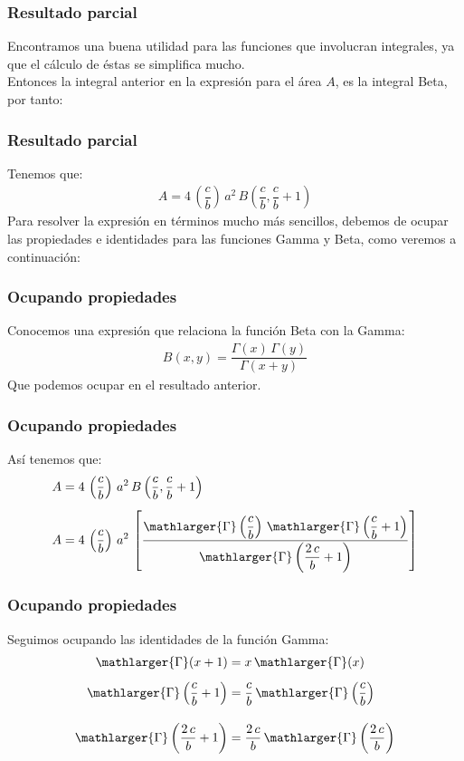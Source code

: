 \begin{frame}
\frametitle{Resultado parcial}
Encontramos una buena utilidad para las funciones que involucran integrales, ya que el cálculo de éstas se simplifica mucho.
\\
\bigskip
\pause
Entonces la integral anterior en la expresión para el área $A$, es la integral Beta, por tanto:
\end{frame}
\begin{frame}
\frametitle{Resultado parcial}
Tenemos que:
\begin{align*}
A = 4 \, \left( \dfrac{c}{b} \right) \, a^{2} \, B \left( \dfrac{c}{b}, \dfrac{c}{b} + 1 \right)
\end{align*}
\pause
Para resolver la expresión en términos mucho más sencillos, debemos de ocupar las propiedades e identidades para las funciones Gamma y Beta, como veremos a continuación:
\end{frame}
\begin{frame}
\frametitle{Ocupando propiedades}
Conocemos una expresión que relaciona la función Beta con la Gamma:
\begin{align*}
B (x, y) = \dfrac{\Gamma (x) \, \Gamma (y)}{\Gamma (x + y)}
\end{align*}
Que podemos ocupar en el resultado anterior.
\end{frame}
\begin{frame}
\frametitle{Ocupando propiedades}
Así tenemos que:
\begin{align*}
A &= 4 \, \left( \dfrac{c}{b} \right) \, a^{2} \, B \left( \dfrac{c}{b}, \dfrac{c}{b} + 1 \right) \\[0.5em]
A &= 4 \, \left( \dfrac{c}{b} \right) \, a^{2} \, \left[ \dfrac{\mathlarger{\Gamma} \left( \dfrac{c}{b} \right) \, \mathlarger{\Gamma} \left( \dfrac{c}{b} + 1 \right)}{\mathlarger{\Gamma} \left( \dfrac{2 \, c}{b} + 1 \right)} \right]
\end{align*}
\end{frame}
\begin{frame}
\frametitle{Ocupando propiedades}
Seguimos ocupando las identidades de la función Gamma:
\begin{align*}
\mathlarger{\Gamma} (x + 1) &= x \, \mathlarger{\Gamma} (x) \\[0.5em]
\mathlarger{\Gamma} \left( \dfrac{c}{b} + 1 \right) &= \dfrac{c}{b} \, \mathlarger{\Gamma} \left( \dfrac{c}{b} \right) \\[1em]
\mathlarger{\Gamma} \left( \dfrac{2 \, c}{b} + 1 \right) &= \dfrac{2 \, c}{b} \, \mathlarger{\Gamma} \left( \dfrac{2 \, c}{b} \right)
\end{align*}
\end{frame}
